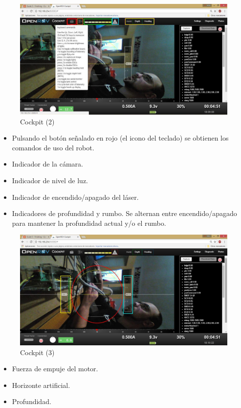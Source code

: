 \begin{figure} [hbtp]
\begin{center}
  \includegraphics[width=15cm]{img/cap3/3_5/cockpit2_v2}
\end{center}
\caption{Cockpit (2)}
\label{fig:cockpit2}
\end{figure}

\begin{itemize}
\item[\textcolor{red}{\textbullet}]Pulsando el botón señalado en rojo (el icono del teclado) se obtienen los comandos de uso del robot.
\item[\textcolor{orange}{\textbullet}]Indicador de la cámara.
\item[\textcolor{green}{\textbullet}]Indicador de nivel de luz.
\item[\textcolor{blue}{\textbullet}]Indicador de encendido/apagado del láser.
\item[\textcolor{yellow}{\textbullet}]Indicadores de profundidad y rumbo. Se alternan entre encendido/apagado para mantener la profundidad actual y/o el rumbo.
\end{itemize}


\newpage
\begin{figure} [hbtp]
\begin{center}
  \includegraphics[width=15cm]{img/cap3/3_5/cockpit3_v2}
\end{center}
\caption{Cockpit (3)}
\label{fig:cockpit3}
\end{figure}
\begin{itemize}
\item[\textcolor{yellow}{\textbullet}]Fuerza de empuje del motor.
\item[\textcolor{red}{\textbullet}]Horizonte artificial.
\item[\textcolor{blue}{\textbullet}]Profundidad.
\end{itemize}

